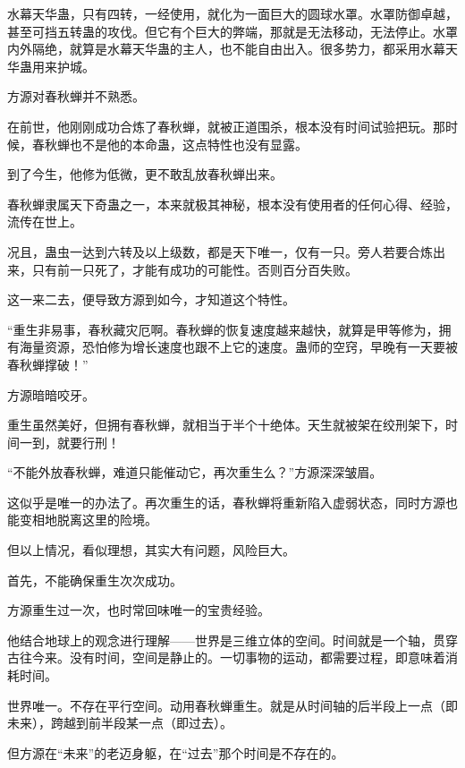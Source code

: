 
\begin{this_body}



水幕天华蛊，只有四转，一经使用，就化为一面巨大的圆球水罩。水罩防御卓越，甚至可挡五转蛊的攻伐。但它有个巨大的弊端，那就是无法移动，无法停止。水罩内外隔绝，就算是水幕天华蛊的主人，也不能自由出入。很多势力，都采用水幕天华蛊用来护城。

方源对春秋蝉并不熟悉。

在前世，他刚刚成功合炼了春秋蝉，就被正道围杀，根本没有时间试验把玩。那时候，春秋蝉也不是他的本命蛊，这点特性也没有显露。

到了今生，他修为低微，更不敢乱放春秋蝉出来。

春秋蝉隶属天下奇蛊之一，本来就极其神秘，根本没有使用者的任何心得、经验，流传在世上。

况且，蛊虫一达到六转及以上级数，都是天下唯一，仅有一只。旁人若要合炼出来，只有前一只死了，才能有成功的可能性。否则百分百失败。

这一来二去，便导致方源到如今，才知道这个特性。

“重生非易事，春秋藏灾厄啊。春秋蝉的恢复速度越来越快，就算是甲等修为，拥有海量资源，恐怕修为增长速度也跟不上它的速度。蛊师的空窍，早晚有一天要被春秋蝉撑破！”

方源暗暗咬牙。

重生虽然美好，但拥有春秋蝉，就相当于半个十绝体。天生就被架在绞刑架下，时间一到，就要行刑！

“不能外放春秋蝉，难道只能催动它，再次重生么？”方源深深皱眉。

这似乎是唯一的办法了。再次重生的话，春秋蝉将重新陷入虚弱状态，同时方源也能变相地脱离这里的险境。

但以上情况，看似理想，其实大有问题，风险巨大。

首先，不能确保重生次次成功。

方源重生过一次，也时常回味唯一的宝贵经验。

他结合地球上的观念进行理解——世界是三维立体的空间。时间就是一个轴，贯穿古往今来。没有时间，空间是静止的。一切事物的运动，都需要过程，即意味着消耗时间。

世界唯一。不存在平行空间。动用春秋蝉重生。就是从时间轴的后半段上一点（即未来），跨越到前半段某一点（即过去）。

但方源在“未来”的老迈身躯，在“过去”那个时间是不存在的。


\end{this_body}
